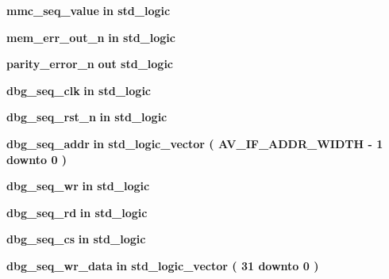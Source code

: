 \begin{DoxyCompactItemize}
\item 
{\bf mmc\+\_\+seq\+\_\+value}  {\bfseries {\bfseries \textcolor{keywordflow}{in}\textcolor{vhdlchar}{ }}} {\bfseries \textcolor{comment}{std\+\_\+logic}\textcolor{vhdlchar}{ }} 
\item 
{\bf mem\+\_\+err\+\_\+out\+\_\+n}  {\bfseries {\bfseries \textcolor{keywordflow}{in}\textcolor{vhdlchar}{ }}} {\bfseries \textcolor{comment}{std\+\_\+logic}\textcolor{vhdlchar}{ }} 
\item 
{\bf parity\+\_\+error\+\_\+n}  {\bfseries {\bfseries \textcolor{keywordflow}{out}\textcolor{vhdlchar}{ }}} {\bfseries \textcolor{comment}{std\+\_\+logic}\textcolor{vhdlchar}{ }} 
\item 
{\bf dbg\+\_\+seq\+\_\+clk}  {\bfseries {\bfseries \textcolor{keywordflow}{in}\textcolor{vhdlchar}{ }}} {\bfseries \textcolor{comment}{std\+\_\+logic}\textcolor{vhdlchar}{ }} 
\item 
{\bf dbg\+\_\+seq\+\_\+rst\+\_\+n}  {\bfseries {\bfseries \textcolor{keywordflow}{in}\textcolor{vhdlchar}{ }}} {\bfseries \textcolor{comment}{std\+\_\+logic}\textcolor{vhdlchar}{ }} 
\item 
{\bf dbg\+\_\+seq\+\_\+addr}  {\bfseries {\bfseries \textcolor{keywordflow}{in}\textcolor{vhdlchar}{ }}} {\bfseries \textcolor{comment}{std\+\_\+logic\+\_\+vector}\textcolor{vhdlchar}{ }\textcolor{vhdlchar}{(}\textcolor{vhdlchar}{ }\textcolor{vhdlchar}{ }\textcolor{vhdlchar}{ }\textcolor{vhdlchar}{ }{\bfseries {\bf A\+V\+\_\+\+I\+F\+\_\+\+A\+D\+D\+R\+\_\+\+W\+I\+D\+TH}} \textcolor{vhdlchar}{-\/}\textcolor{vhdlchar}{ } \textcolor{vhdldigit}{1} \textcolor{vhdlchar}{ }\textcolor{keywordflow}{downto}\textcolor{vhdlchar}{ }\textcolor{vhdlchar}{ } \textcolor{vhdldigit}{0} \textcolor{vhdlchar}{ }\textcolor{vhdlchar}{)}\textcolor{vhdlchar}{ }} 
\item 
{\bf dbg\+\_\+seq\+\_\+wr}  {\bfseries {\bfseries \textcolor{keywordflow}{in}\textcolor{vhdlchar}{ }}} {\bfseries \textcolor{comment}{std\+\_\+logic}\textcolor{vhdlchar}{ }} 
\item 
{\bf dbg\+\_\+seq\+\_\+rd}  {\bfseries {\bfseries \textcolor{keywordflow}{in}\textcolor{vhdlchar}{ }}} {\bfseries \textcolor{comment}{std\+\_\+logic}\textcolor{vhdlchar}{ }} 
\item 
{\bf dbg\+\_\+seq\+\_\+cs}  {\bfseries {\bfseries \textcolor{keywordflow}{in}\textcolor{vhdlchar}{ }}} {\bfseries \textcolor{comment}{std\+\_\+logic}\textcolor{vhdlchar}{ }} 
\item 
{\bf dbg\+\_\+seq\+\_\+wr\+\_\+data}  {\bfseries {\bfseries \textcolor{keywordflow}{in}\textcolor{vhdlchar}{ }}} {\bfseries \textcolor{comment}{std\+\_\+logic\+\_\+vector}\textcolor{vhdlchar}{ }\textcolor{vhdlchar}{(}\textcolor{vhdlchar}{ }\textcolor{vhdlchar}{ } \textcolor{vhdldigit}{31} \textcolor{vhdlchar}{ }\textcolor{keywordflow}{downto}\textcolor{vhdlchar}{ }\textcolor{vhdlchar}{ } \textcolor{vhdldigit}{0} \textcolor{vhdlchar}{ }\textcolor{vhdlchar}{)}\textcolor{vhdlchar}{ }} 

\end{DoxyCompactItemize}
